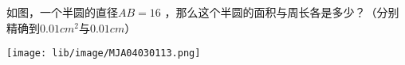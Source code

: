 如图，一个半圆的直径$AB=16$ ，那么这个半圆的面积与周长各是多少？（分别精确到$0.01cm^2$与$0.01cm$）
\begin{center}
    \texttt{[image: lib/image/MJA04030113.png]}
\end{center}